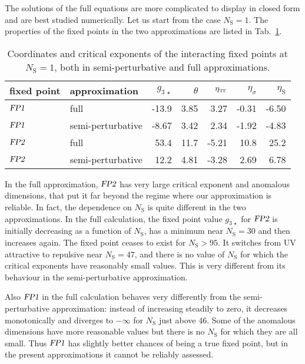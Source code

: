 \documentclass[11pt]{book}
\newcommand\TTspace{ -1pt }
\newcommand\etaTT{ \eta_{\scriptscriptstyle{\mathrm{T\hspace{\TTspace}T}}} }
\newcommand\etaS{ \eta_{\scriptscriptstyle{\mathrm{S}}} }
\newcommand\NS{ N_{\scriptscriptstyle{\mathrm{S}}} }
\newcommand{\FPone}  {\textsl{FP1}}
\newcommand{\FPtwo}  {\textsl{FP2}}
\numberwithin{equation}{chapter}
\begin{document}
The solutions of the full equations are more complicated to display
in closed form and are best studied numerically.
Let us start from the case $\NS=1$.
The properties of the fixed points in the two approximations
are listed in Tab.~\ref{FPtab3}.
\begin{table}[]
  \begin{center}
    \begin{tabular}{ l l r r r r r }
      \toprule
      fixed point & approximation     & $g_{3\,\star}$ & $\theta$ & $\etaTT$        & $\eta_{\sigma}$ & $\etaS$ \\
      \midrule
      $\FPone$    & full              & -13.9          & 3.85     & 3.27            & -0.31           & -6.50   \\
      $\FPone$    & semi-perturbative & -8.67          & 3.42     & 2.34            & -1.92           & -4.83   \\
      $\FPtwo$    & full              & 53.4           & 11.7     & -5.21           & 10.8            & 25.2    \\
      $\FPtwo$    & semi-perturbative & 12.2           & 4.81     & -3.28           & 2.69            & 6.78    \\
      \bottomrule
    \end{tabular}
  \end{center}
  \caption[Coordinates and critical exponents of fixed points for one scalar]
  {
    Coordinates and critical exponents of the interacting fixed points at $\NS=1$,
    both in semi-perturbative and full approximations.
  }
  \label{FPtab3}
\end{table}
In the full approximation, $\FPtwo$ has very large critical exponent and anomalous dimensions,
that put it far beyond the regime where our approximation is reliable.
In fact, the dependence on $\NS$ is quite different in the two approximations.
In the full calculation, the fixed point value $g_{3\,\star}$ for $\FPtwo$
is initially decreasing as a function of $\NS$,
has a minimum near $\NS=30$ and then increases again.
The fixed point ceases to exist for $\NS>95$.
It switches from UV attractive to repulsive near $\NS=47$,
and there is no value of $\NS$ for which the critical exponents
have reasonably small values.
This is very different from its behaviour in the semi-perturbative
approximation.

Also $\FPone$ in the full calculation behaves very differently from
the semi-perturbative approximation:
instead of increasing steadily to zero, it decreases monotonically
and diverges to $-\infty$ for $\NS$ just above $46$.
Some of the anomalous dimensions have more reasonable values
but there is no $\NS$ for which they are all small.
Thus $\FPone$ has slightly better chances of being
a true fixed point, but in the present approximations
it cannot be reliably assessed.
\end{document}
